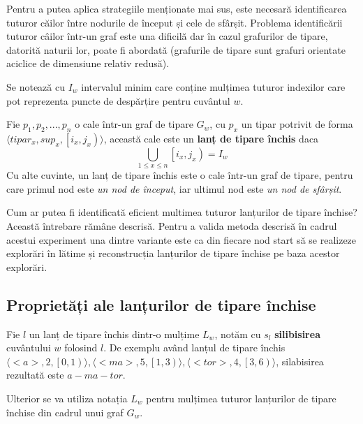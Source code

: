 Pentru a putea aplica strategiile menționate mai sus, este necesară identificarea tuturor căilor între nodurile de început și cele de sfârșit. Problema identificării tuturor câilor într-un graf este una dificilă dar în cazul grafurilor de tipare, datorită naturii lor, poate fi abordată (grafurile de tipare sunt grafuri orientate aciclice de dimensiune relativ redusă). 

\begin{defi}
Se notează cu $I_w$ intervalul minim care conține mulțimea tuturor indexilor care pot reprezenta puncte de despărțire pentru cuvântul $w$.
\end{defi}

\begin{defi}
Fie $p_1, p_2, ..., p_n$ o cale într-un graf de tipare $G_w$, cu $p_x$ un tipar potrivit de forma $\langle tipar_x, sup_x, \left[i_x,j_x\right)\rangle$, această cale este un \textbf{lanț de tipare închis} daca 
\begin{equation}
\bigcup_{1 \leq x \leq n} \left[i_x,j_x\right) = I_w
\end{equation}
Cu alte cuvinte, un lanț de tipare închis este o cale într-un graf de tipare, pentru care primul nod este \textit{un nod de început}, iar ultimul nod este \textit{un nod de sfârșit}.
\end{defi}

Cum ar putea fi identificată eficient multimea tuturor lanțurilor de tipare închise? Această întrebare rămâne descrisă. Pentru a valida metoda descrisă în cadrul acestui experiment una dintre variante este ca din fiecare nod start să se realizeze explorări în lătime și reconstrucția lanțurilor de tipare închise pe baza acestor explorări.

\subsection{Proprietăți ale lanțurilor de tipare închise}

\begin{defi}
Fie $l$ un lanț de tipare închis dintr-o mulțime $L_w$, notăm cu $s_{l}$ \textbf{silibisirea} cuvântului $w$ folosind $l$. De exemplu având lanțul de tipare închis $\langle <a>, 2, \left[ 0, 1 \right)\rangle, \langle <ma>, 5, \left[ 1, 3 \right)\rangle, \langle <tor>, 4, \left[ 3, 6 \right)\rangle$, silabisirea rezultată este $a-ma-tor$. 
\end{defi}

Ulterior se va utiliza notația $L_w$ pentru mulțimea tuturor lanțurilor de tipare închise din cadrul unui graf $G_w$.

